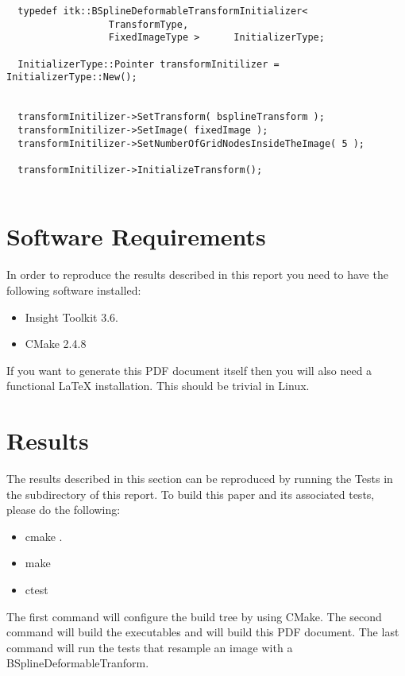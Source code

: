 \documentclass{InsightArticle}
\begin{document}
\small
\begin{verbatim}
  typedef itk::BSplineDeformableTransformInitializer<
                  TransformType, 
                  FixedImageType >      InitializerType;

  InitializerType::Pointer transformInitilizer = InitializerType::New();


  transformInitilizer->SetTransform( bsplineTransform );
  transformInitilizer->SetImage( fixedImage );
  transformInitilizer->SetNumberOfGridNodesInsideTheImage( 5 );

  transformInitilizer->InitializeTransform();
 
\end{verbatim}
\normalsize


\section{Software Requirements}

In order to reproduce the results described in this report you need to have the
following software installed:

\begin{itemize}
  \item  Insight Toolkit 3.6.
  \item  CMake 2.4.8
\end{itemize}

If you want to generate this PDF document itself then you will also need a
functional LaTeX installation. This should be trivial in Linux.

\appendix

\section{Results}

The results described in this section can be reproduced by running the Tests in
the  subdirectory of this report. To build this paper and its
associated tests, please do the following:

\begin{itemize}
\item cmake .
\item make
\item ctest
\end{itemize}

The first command will configure the build tree by using CMake. The second
command will build the executables and will build this PDF document. The last
command will run the tests that resample an image with a
BSplineDeformableTranform.
\end{document}
